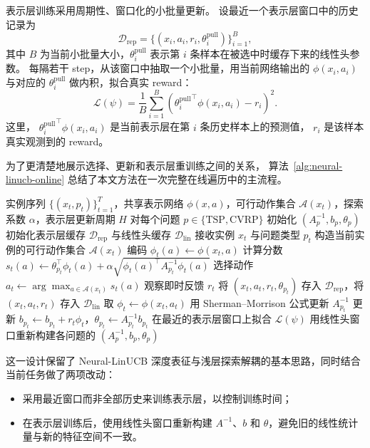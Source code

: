 表示层训练采用周期性、窗口化的小批量更新。
设最近一个表示层窗口中的历史记录为
\[
  \mathcal{D}_{\mathrm{rep}}
  =
  \{(x_i, a_i, r_i, \theta_i^{\text{pull}})\}_{i=1}^{B},
\]
其中 $B$ 为当前小批量大小，$\theta_i^{\text{pull}}$ 表示第 $i$ 条样本在被选中时缓存下来的线性头参数。
每隔若干 step，从该窗口中抽取一个小批量，用当前网络输出的 $\phi(x_i, a_i)$ 与对应的 $\theta_i^{\text{pull}}$ 做内积，拟合真实 reward：
\begin{equation}
  \mathcal{L}(\psi)
  =
  \frac{1}{B}
  \sum_{i=1}^{B}
  \left(
    {\theta_i^{\text{pull}}}^{\top}\phi(x_i, a_i)-r_i
  \right)^2.
  \label{eq:representation-loss}
\end{equation}
这里，
${\theta_i^{\text{pull}}}^{\top}\phi(x_i, a_i)$
是当前表示层在第 $i$ 条历史样本上的预测值，
$r_i$ 是该样本真实观测到的 reward。

为了更清楚地展示选择、更新和表示层重训练之间的关系，
算法~\ref{alg:neural-linucb-online} 总结了本文方法在一次完整在线遍历中的主流程。

\begin{algorithm}[htb]
  \caption{算子选择的 Problem-Specific Neural-LinUCB 在线流程}
  \label{alg:neural-linucb-online}
  \small
  \begin{algorithmic}[1]
    \Require 实例序列 $\{(x_t, p_t)\}_{t=1}^T$，共享表示网络 $\phi(x,a)$，可行动作集合 $\mathcal{A}(x_t)$，探索系数 $\alpha$，表示层更新周期 $H$
    \State 对每个问题 $p \in \{\mathrm{TSP}, \mathrm{CVRP}\}$ 初始化 $(A_p^{-1}, b_p, \theta_p)$
    \State 初始化表示层缓存 $\mathcal{D}_{\mathrm{rep}}$ 与线性头缓存 $\mathcal{D}_{\mathrm{lin}}$
      \State 接收实例 $x_t$ 与问题类型 $p_t$
      \State 构造当前实例的可行动作集合 $\mathcal{A}(x_t)$
        \State 编码 $\phi_t(a) \gets \phi(x_t, a)$
        \State 计算分数 $s_t(a) \gets \theta_{p_t}^{\top}\phi_t(a) + \alpha \sqrt{\phi_t(a)^{\top} A_{p_t}^{-1}\phi_t(a)}$
      \EndFor
      \State 选择动作 $a_t \gets \arg\max_{a \in \mathcal{A}(x_t)} s_t(a)$
      \State 观察即时反馈 $r_t$
      \State 将 $(x_t, a_t, r_t, \theta_{p_t})$ 存入 $\mathcal{D}_{\mathrm{rep}}$，将 $(x_t, a_t, r_t)$ 存入 $\mathcal{D}_{\mathrm{lin}}$
      \State 取 $\phi_t \gets \phi(x_t, a_t)$
      \State 用 Sherman--Morrison 公式更新 $A_{p_t}^{-1}$
      \State 更新 $b_{p_t} \gets b_{p_t} + r_t \phi_t$，$\theta_{p_t} \gets A_{p_t}^{-1} b_{p_t}$
        \State 在最近的表示层窗口上拟合 $\mathcal{L}(\psi)$
        \State 用线性头窗口重新构建各问题的 $(A_p^{-1}, b_p, \theta_p)$
      \EndIf
    \EndFor
  \end{algorithmic}
\end{algorithm}

这一设计保留了 Neural-LinUCB 深度表征与浅层探索解耦的基本思路，同时结合当前任务做了两项改动：
\begin{itemize}
  \item 采用最近窗口而非全部历史来训练表示层，以控制训练时间；
  \item 在表示层训练后，使用线性头窗口重新构建 $A^{-1}$、$b$ 和 $\theta$，避免旧的线性统计量与新的特征空间不一致。
\end{itemize}
